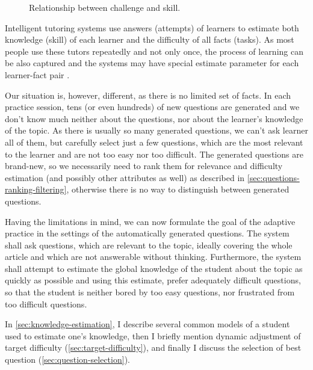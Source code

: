 \documentclass[12pt, twoside]{fithesis2}		%
\renewcommand{\_}{\leavevmode \kern0.07em\vbox{\hrule width0.4em}}
\begin{document}
\begin{figure}[h]
  \centering
  \caption{Relationship between challenge and skill.}
  \label{fig:flow}
\end{figure}

Intelligent tutoring systems use answers (attempts) of learners to estimate both knowledge (skill) of each learner and the difficulty of all facts (tasks).
As most people use these tutors repeatedly and not only once, the process of learning can be also captured
and the systems may have special estimate parameter for each learner-fact pair \cite{slepe-mapy}.

Our situation is, however, different, as there is no limited set of facts.
In each practice session, tens (or even hundreds) of new questions are generated
and we don't know much neither about the questions, nor about the learner's knowledge of the topic.
As there is usually so many generated questions, we can't ask learner all of them,
but carefully select just a few questions, which are the most relevant to the learner and are not too easy nor too difficult.
The generated questions are brand-new, so we necessarily need to rank them for relevance and difficulty estimation (and possibly other attributes as well) as described in \autoref{sec:questions-ranking-filtering},
otherwise there is no way to distinguish between generated questions.

Having the limitations in mind, we can now formulate the goal of the adaptive practice in the settings of the automatically generated questions.
The system shall ask questions, which are relevant to the topic, ideally covering the whole article and which are not answerable without thinking. Furthermore, the system shall attempt to estimate the global knowledge of the student about the topic as quickly as possible and using this estimate, prefer adequately difficult questions, so that the student is neither bored by too easy questions, nor frustrated from too difficult questions.

In \autoref{sec:knowledge-estimation}, I describe several common models of a student used to estimate one's knowledge, then I briefly mention dynamic adjustment of target difficulty (\autoref{sec:target-difficulty}),
and finally I discuss the selection of best question (\autoref{sec:question-selection}).
\end{document}
